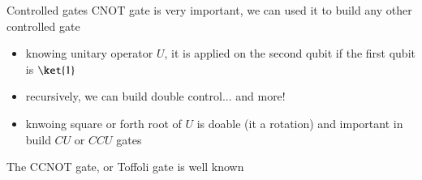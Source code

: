 \begin{frame}{Controlled gates}
CNOT gate is very important, we can used it to build any other controlled gate
\begin{itemize}
    \item knowing unitary operator $U$, it is applied on the second qubit if the first qubit is $\ket{1}$
    \item recursively, we can build double control... and more!
    \item knwoing square or forth root of $U$ is doable (it a rotation) and important in build $CU$ or $CCU$ gates
\end{itemize}   
\begin{center}
\end{center}
The CCNOT gate, or Toffoli gate is well known
\begin{center}
\end{center}
\end{frame}

